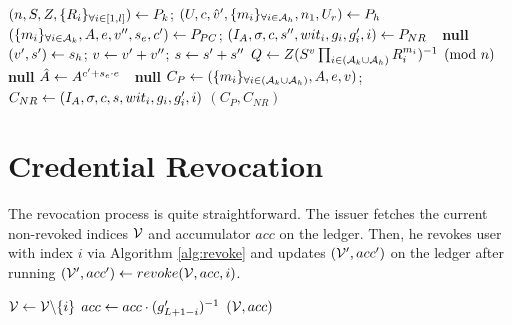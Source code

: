 \documentclass{article}
\begin{document}
\begin{algorithm}
\caption{$\issuethp $}
\label{alg:ci3}
\begin{algorithmic}
	\State $(n, S, Z, \{R_i\}_{\forall i\in [1,l]}) \leftarrow P_{k}$; $(U, c, \hat{v}', \{m_{i}\}_{\forall i\in \mathcal{A}_{h}},n_{1}, U_{r}) \leftarrow P_{h}$
	\State $(\{m_i\}_{\forall i\in \mathcal{A}_{k} }, A, e, v'', s_{e}, c') \leftarrow P_{PC}$; $(I_{A}, \sigma , c, s'', wit_{i}, g_i, g'_i, i) \leftarrow P_{NR}$
		\State $\mbox{    }$\Return \textbf{null}
	\EndIf
	\State $(v', s') \leftarrow s_{h}$; $v\leftarrow v' + v''$; $s\leftarrow s' + s''$
	\State $Q\leftarrow Z(S^{v}\prod _{i\in (\mathcal{A}_{k} \cup \mathcal{A}_{h})}R_{i}^{m_{i}})^{-1}\pmod{n}$
		\State $\mbox{    }$\Return \textbf{null}
	\EndIf
	\State $\hat{A}\leftarrow A^{c'+s_{e}\cdot e}$
		\State $\mbox{    }$\Return \textbf{null}
	\Else \State $C_{P}\leftarrow (\{m_i\}_{\forall i\in (\mathcal{A}_{k} \cup \mathcal{A}_{h} )}, A, e, v)$; $C_{NR}\leftarrow (I_{A}, \sigma , c, s, wit_{i}, g_i, g'_i, i)$
	\State \Return $(C_{P}, C_{NR})$
	\EndIf
\end{algorithmic}
\end{algorithm}

\section{Credential Revocation}
The revocation process is quite straightforward. The issuer fetches the current non-revoked indices $\mathcal{V}$ and accumulator $acc$ on the ledger. Then, he revokes user with index $i$ via Algorithm \ref{alg:revoke} and updates $(\mathcal{V}', acc')$ on the ledger after running $(\mathcal{V}', acc')\leftarrow revoke(\mathcal{V}, acc, i)$. 

\begin{algorithm}
\caption{$revoke(\mc{V}, acc, i)$}
\label{alg:revoke}
\begin{algorithmic}
	\State $\mathcal{V} \leftarrow \mathcal{V} \backslash \{i\}$
	\State $acc \leftarrow acc \cdot (g'_{L+1-i})^{-1}$
	\State \Return $(\mathcal{V}, acc)$
\end{algorithmic}
\end{algorithm}
\end{document}
